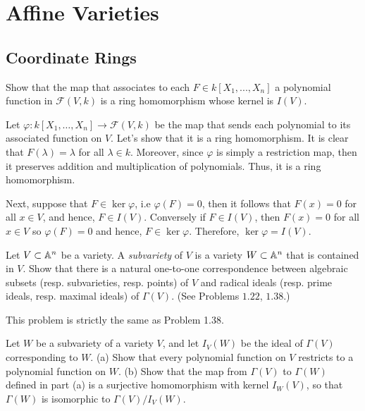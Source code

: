 \chapter{Affine Varieties}

\section{Coordinate Rings}

\begin{exercise}
    Show that the map that associates to each $F \in k[X_1, ..., X_n]$ a polynomial function in $\mathcal{F}(V,k)$ is a ring homomorphism whose kernel is $I(V)$. \\
\end{exercise}

\begin{solution}
    Let $\varphi : k[X_1, \dots, X_n] \to \mathcal{F}(V,k)$ be the map that sends each polynomial to its associated function on $V$. Let's show that it is a ring homomorphism. It is clear that $F(\lambda) = \lambda$ for all $\lambda \in k$. Moreover, since $\varphi$ is simply a restriction map, then it preserves addition and multiplication of polynomials. Thus, it is a ring homomorphism.
    
    Next, suppose that $F \in \ker \varphi$, i.e $\varphi(F) = 0$, then it follows that $F(x) = 0$ for all $x \in V$, and hence, $F \in I(V)$. Conversely if $F \in I(V)$, then $F(x) = 0$ for all $x \in V$ so $\varphi(F) = 0$ and hence, $F \in \ker \varphi$. Therefore, $\ker \varphi = I(V)$. \\
\end{solution}

\begin{exercise}
    Let $V \subset \mathbb{A}^n$ be a variety. A \textit{subvariety} of $V$ is a variety $W \subset \mathbb{A}^n$ that is contained in $V$. Show that there is a natural one-to-one correspondence between algebraic subsets (resp. subvarieties, resp. points) of $V$ and radical ideals (resp. prime ideals, resp. maximal ideals) of $\Gamma(V)$. (See Problems $1.22$, $1.38$.)\\
\end{exercise}

\begin{solution}
    This problem is strictly the same as Problem 1.38. \\
\end{solution}

\begin{exercise}
    Let $W$ be a subvariety of a variety $V$, and let $I_V(W)$ be the ideal of $\Gamma(V)$ corresponding to $W$. (a) Show that every polynomial function on $V$ restricts to a polynomial function on $W$. (b) Show that the map from $\Gamma(V)$ to $\Gamma(W)$ defined in part (a) is a surjective homomorphism with kernel $I_W(V)$, so that $\Gamma(W)$ is isomorphic to $\Gamma(V)/I_V(W)$.\\
\end{exercise}

